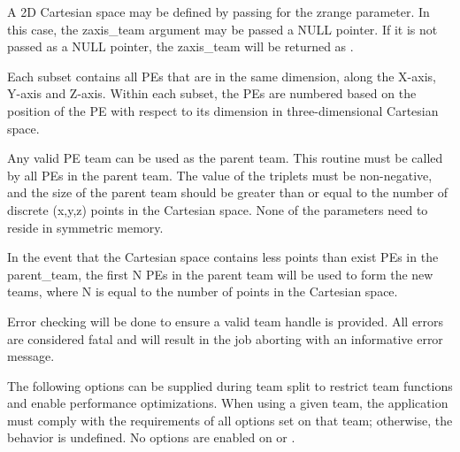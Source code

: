 \begin{apidefinition}
{A 2D Cartesian space may be defined by passing  for the zrange
parameter. In this case, the zaxis\_team argument may be passed a NULL
pointer. If it is not passed as a NULL pointer, the zaxis\_team will be returned
as .

Each subset contains all \acp{PE} that are in the same
dimension, along the X-axis, Y-axis and Z-axis. Within each subset,
the \acp{PE} are numbered based on the position of the \ac{PE} with respect to its
dimension in three-dimensional Cartesian space.

Any valid \ac{PE} team can be used as the parent team. This routine must be
called by all \acp{PE} in the parent team. The value of the triplets must be
non-negative, and the size of the parent team should be greater than or
equal to the number of discrete (x,y,z) points in the Cartesian space.
None of the parameters need to reside in symmetric memory.

In the event that the Cartesian space contains less points than exist \acp{PE}
in the parent\_team, the first N \acp{PE} in the parent team will be used
to form the new teams, where N is equal to the number of points in the
Cartesian space.

Error checking will be done to ensure a valid team handle is provided.
All errors are considered fatal and will result in the job aborting with
an informative error message.

The following options can be supplied during team split to restrict
team functions and enable performance optimizations.  When using a given
team, the application must comply with the requirements of all options
set on that team; otherwise, the behavior is undefined.
No options are enabled on  or .

}



\begin{apiexamples}

\end{apiexamples}

\end{apidefinition}
